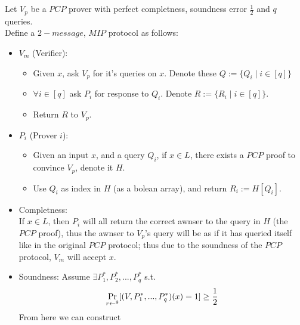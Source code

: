 \subsection{}


\subsection{}
Let $V_p$ be a $PCP$ prover with perfect completness, soundness error $\frac{1}{2}$ and $q$ queries.\\
Define a $2-message$, $MIP$ protocol as follows:
\begin{itemize}
    \item $V_m$ (Verifier):\\
        \begin{itemize}
            \item Given $x$, ask $V_p$ for it's queries on $x$. Denote these $Q:=\{Q_i\mid i\in[q]\}$\\
            \item $\forall i\in[q]$ ask $P_i$ for response to $Q_i$. Denote $R:=\{R_i\mid i\in[q]\}$.\\
            \item Return $R$ to $V_p$.\\
        \end{itemize}
    \item $P_i$ (Prover $i$):\\
        \begin{itemize}
            \item Given an input $x$, and a query $Q_i$,
                if $x\in L$, there exists a $PCP$ proof to convince $V_p$, denote it $H$.
            \item Use $Q_i$ as index in $H$ (as a bolean array), and return $R_i:=H[Q_i]$.
        \end{itemize}
\end{itemize}
\begin{itemize}
    \item Completness:\\
        If $x\in L$, then $P_i$ will all return the correct awnser to the
        query in $H$ (the $PCP$ proof), thus the awnser to $V_p$'s query will be
        as if it has queried itself like in the original $PCP$ protocol; thus due to the soundness
        of the $PCP$ protocol, $V_m$ will accept $x$.
    \item Soundness:
        Assume $\exists P_1^*,P_2^*,...,P_q^*$ s.t.
        \[\operatorname*{Pr}_{r\leftarrow^\$}[(V,P_1^*,...,P_q^*)(x)=1]\geq \frac{1}{2}\]
        From here we can construct
\end{itemize}
